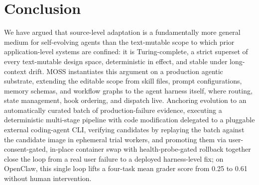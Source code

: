 \documentclass{article}
\begin{document}
\section{Conclusion}
\label{sec:conclusion}

We have argued that source-level adaptation is a fundamentally more general medium for self-evolving agents than the text-mutable scope to which prior application-level systems are confined: it is Turing-complete, a strict superset of every text-mutable design space, deterministic in effect, and stable under long-context drift. MOSS instantiates this argument on a production agentic substrate, extending the editable scope from skill files, prompt configurations, memory schemas, and workflow graphs to the agent harness itself, where routing, state management, hook ordering, and dispatch live. Anchoring evolution to an automatically curated batch of production-failure evidence, executing a deterministic multi-stage pipeline with code modification delegated to a pluggable external coding-agent CLI, verifying candidates by replaying the batch against the candidate image in ephemeral trial workers, and promoting them via user-consent-gated, in-place container swap with health-probe-gated rollback together close the loop from a real user failure to a deployed harness-level fix; on OpenClaw, this single loop lifts a four-task mean grader score from 0.25 to 0.61 without human intervention.





\end{document}
